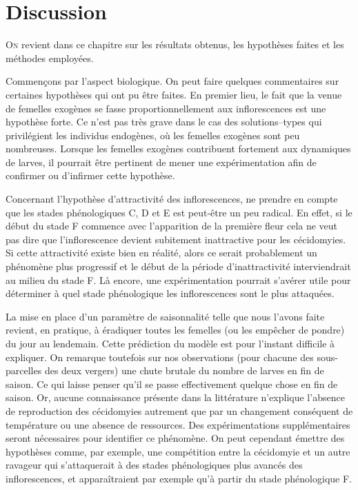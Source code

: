 \chapter{Discussion} 

\lettrine{O}{n} revient dans ce chapitre sur les résultats obtenus, les hypothèses faites et les méthodes employées.

Commençons par l'aspect biologique.
On peut faire quelques commentaires sur certaines hypothèses qui ont pu être faites.
En premier lieu, le fait que la venue de femelles exogènes se fasse proportionnellement aux inflorescences est une hypothèse forte.
Ce n'est pas très grave dans le cas des solutions--types qui privilégient les individus endogènes, où les femelles exogènes sont peu nombreuses.
Lorsque les femelles exogènes contribuent fortement aux dynamiques de larves, il pourrait être pertinent de mener une expérimentation afin de confirmer ou d'infirmer cette hypothèse.

Concernant l'hypothèse d'attractivité des inflorescences, ne prendre en compte que les stades phénologiques C, D et E est peut-être un peu radical.
En effet, si le début du stade F commence avec l'apparition de la première fleur cela ne veut pas dire que l'inflorescence devient subitement inattractive pour les cécidomyies.
Si cette attractivité existe bien en réalité, alors ce serait probablement un phénomène plus progressif et le début de la période d'inattractivité interviendrait au milieu du stade F.
Là encore, une expérimentation pourrait s'avérer utile pour déterminer à quel stade phénologique les inflorescences sont le plus attaquées.

La mise en place d'un paramètre de saisonnalité telle que nous l'avons faite revient, en pratique, à éradiquer toutes les femelles (ou les empêcher de pondre) du jour au lendemain.
Cette prédiction du modèle est pour l'instant difficile à expliquer. 
On remarque toutefois sur nos observations (pour chacune des sous-parcelles des deux vergers) une chute brutale du nombre de larves en fin de saison.
Ce qui laisse penser qu'il se passe effectivement quelque chose en fin de saison.
Or, aucune connaissance présente dans la littérature n'explique l'absence de reproduction des cécidomyies autrement que par un changement conséquent de température ou une absence de ressources.
Des expérimentations supplémentaires seront nécessaires pour identifier ce phénomène.
On peut cependant émettre des hypothèses comme, par exemple, une compétition entre la cécidomyie et un autre ravageur qui s'attaquerait à des stades phénologiques plus avancés des inflorescences,  et apparaîtraient par exemple qu'à partir du stade phénologique F.

